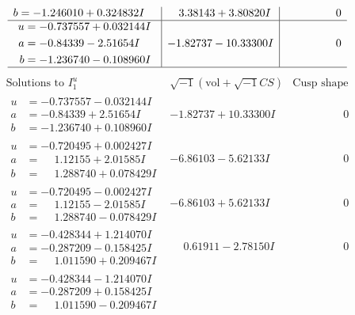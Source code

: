 \documentclass[1p]{elsarticle_modified}
\theoremstyle{definition}
\newcommand{\I}{\sqrt{-1}}
\begin{document}
$$\begin{array}{c|c|c}
\begin{aligned}
b &= -1.246010 + 0.324832 I\end{aligned}
 & \phantom{-}3.38143 + 3.80820 I & \phantom{-0.000000 } 0 \\ \hline\begin{aligned}
u &= -0.737557 + 0.032144 I \\
a &= -0.84339 - 2.51654 I \\
b &= -1.236740 - 0.108960 I\end{aligned}
 & -1.82737 - 10.33300 I & \phantom{-0.000000 } 0\\
 \hline 
 \end{array}$$\newpage$$\begin{array}{c|c|c}  
\text{Solutions to }I^u_{1}& \I (\text{vol} + \sqrt{-1}CS) & \text{Cusp shape}\\
 \hline 
\begin{aligned}
u &= -0.737557 - 0.032144 I \\
a &= -0.84339 + 2.51654 I \\
b &= -1.236740 + 0.108960 I\end{aligned}
 & -1.82737 + 10.33300 I & \phantom{-0.000000 } 0 \\ \hline\begin{aligned}
u &= -0.720495 + 0.002427 I \\
a &= \phantom{-}1.12155 + 2.01585 I \\
b &= \phantom{-}1.288740 + 0.078429 I\end{aligned}
 & -6.86103 - 5.62133 I & \phantom{-0.000000 } 0 \\ \hline\begin{aligned}
u &= -0.720495 - 0.002427 I \\
a &= \phantom{-}1.12155 - 2.01585 I \\
b &= \phantom{-}1.288740 - 0.078429 I\end{aligned}
 & -6.86103 + 5.62133 I & \phantom{-0.000000 } 0 \\ \hline\begin{aligned}
u &= -0.428344 + 1.214070 I \\
a &= -0.287209 - 0.158425 I \\
b &= \phantom{-}1.011590 + 0.209467 I\end{aligned}
 & \phantom{-}0.61911 - 2.78150 I & \phantom{-0.000000 } 0 \\ \hline\begin{aligned}
u &= -0.428344 - 1.214070 I \\
a &= -0.287209 + 0.158425 I \\
b &= \phantom{-}1.011590 - 0.209467 I\end{aligned}

\end{array}$$
\end{document}
